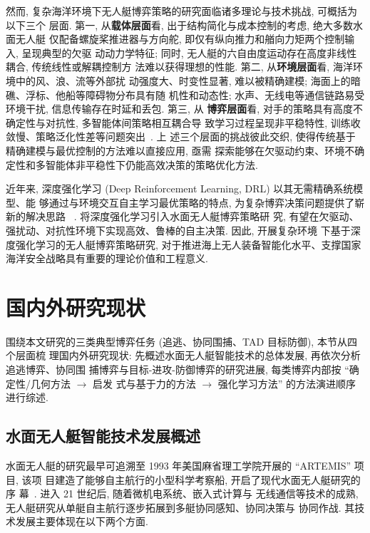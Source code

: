 然而, 复杂海洋环境下无人艇博弈策略的研究面临诸多理论与技术挑战, 可概括为以下三个
层面. 第一, 从\textbf{载体层面}看, 出于结构简化与成本控制的考虑, 绝大多数水面无人艇
仅配备螺旋桨推进器与方向舵, 即仅有纵向推力和艏向力矩两个控制输入, 呈现典型的欠驱
动动力学特征; 同时, 无人艇的六自由度运动存在高度非线性耦合, 传统线性或解耦控制方
法难以获得理想的性能. 第二, 从\textbf{环境层面}看, 海洋环境中的风、浪、流等外部扰
动强度大、时变性显著, 难以被精确建模; 海面上的暗礁、浮标、他船等障碍物分布具有随
机性和动态性; 水声、无线电等通信链路易受环境干扰, 信息传输存在时延和丢包. 第三, 从
\textbf{博弈层面}看, 对手的策略具有高度不确定性与对抗性, 多智能体间策略相互耦合导
致学习过程呈现非平稳特性, 训练收敛慢、策略泛化性差等问题突出~\cite{drl_2018}. 上
述三个层面的挑战彼此交织, 使得传统基于精确建模与最优控制的方法难以直接应用, 亟需
探索能够在欠驱动约束、环境不确定性和多智能体非平稳性下仍能高效决策的策略优化方法.

近年来, 深度强化学习 (Deep Reinforcement Learning, DRL) 以其无需精确系统模型、能
够通过与环境交互自主学习最优策略的特点, 为复杂博弈决策问题提供了崭新的解决思路
~\cite{sutton2018reinforcement,drl_2018}. 将深度强化学习引入水面无人艇博弈策略研
究, 有望在欠驱动、强扰动、对抗性环境下实现高效、鲁棒的自主决策. 因此, 开展复杂环境
下基于深度强化学习的无人艇博弈策略研究, 对于推进海上无人装备智能化水平、支撑国家
海洋安全战略具有重要的理论价值和工程意义.

\section{国内外研究现状}
\label{sec:review}
围绕本文研究的三类典型博弈任务 (追逃、协同围捕、TAD 目标防御), 本节从四个层面梳
理国内外研究现状: 先概述水面无人艇智能技术的总体发展, 再依次分析追逃博弈、协同围
捕博弈与目标-进攻-防御博弈的研究进展, 每类博弈内部按 ``确定性/几何方法 $\to$ 启发
式与基于力的方法 $\to$ 强化学习方法'' 的方法演进顺序进行综述.

\subsection{水面无人艇智能技术发展概述}
\label{subsec:usv_ctrl}
水面无人艇的研究最早可追溯至 1993 年美国麻省理工学院开展的 ``ARTEMIS'' 项目, 该项
目建造了能够自主航行的小型科学考察船, 开启了现代水面无人艇研究的序
幕~\cite{peng2021usv,liao2014usv}. 进入 21 世纪后, 随着微机电系统、嵌入式计算与
无线通信等技术的成熟, 无人艇研究从单艇自主航行逐步拓展到多艇协同感知、协同决策与
协同作战. 其技术发展主要体现在以下两个方面.

